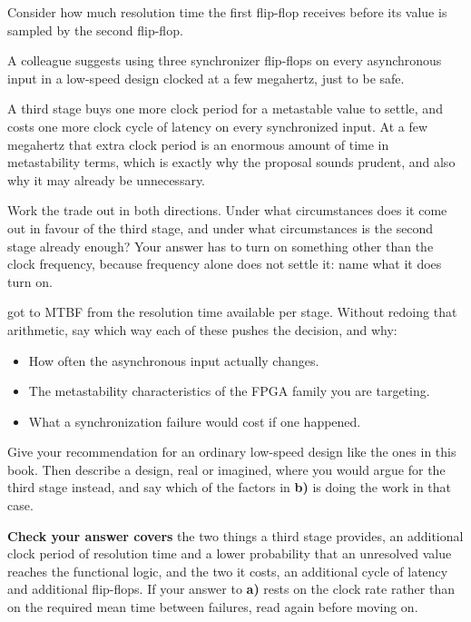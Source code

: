 \note[Tip] Consider how much resolution time the first flip-flop receives before its value is
sampled by the second flip-flop.

\label{c4:ex:4}
A colleague suggests using three synchronizer flip-flops on every asynchronous input in a low-speed
design clocked at a few megahertz, just to be safe.

A third stage buys one more clock period for a metastable value to settle, and costs one more clock
cycle of latency on every synchronized input. At a few megahertz that extra clock period is an
enormous amount of time in metastability terms, which is exactly why the proposal sounds prudent,
and also why it may already be unnecessary.

\begin{parts}
  \item Work the trade out in both directions. Under what circumstances does it come out in favour
    of the third stage, and under what circumstances is the second stage already enough? Your
    answer has to turn on something other than the clock frequency, because frequency alone does
    not settle it: name what it does turn on.
  \item {} got to MTBF from the resolution time available per stage. Without redoing
    that arithmetic, say which way each of these pushes the decision, and why:
    \begin{itemize}
      \item How often the asynchronous input actually changes.
      \item The metastability characteristics of the FPGA family you are targeting.
      \item What a synchronization failure would cost if one happened.
    \end{itemize}
  \item Give your recommendation for an ordinary low-speed design like the ones in this book. Then
    describe a design, real or imagined, where you would argue for the third stage instead, and say
    which of the factors in \textbf{b)} is doing the work in that case.
\end{parts}
\textbf{Check your answer covers} the two things a third stage provides, an additional clock period
of resolution time and a lower probability that an unresolved value reaches the functional logic,
and the two it costs, an additional cycle of latency and additional flip-flops. If your answer to
\textbf{a)} rests on the clock rate rather than on the required mean time between failures, read
 again before moving on.

